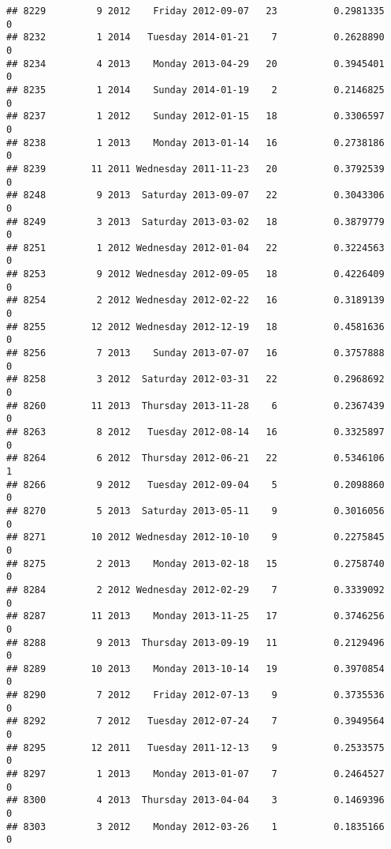 \documentclass[
]{article}
\begin{document}
\begin{verbatim}
## 8229         9 2012    Friday 2012-09-07   23          0.2981335             0
## 8232         1 2014   Tuesday 2014-01-21    7          0.2628890             0
## 8234         4 2013    Monday 2013-04-29   20          0.3945401             0
## 8235         1 2014    Sunday 2014-01-19    2          0.2146825             0
## 8237         1 2012    Sunday 2012-01-15   18          0.3306597             0
## 8238         1 2013    Monday 2013-01-14   16          0.2738186             0
## 8239        11 2011 Wednesday 2011-11-23   20          0.3792539             0
## 8248         9 2013  Saturday 2013-09-07   22          0.3043306             0
## 8249         3 2013  Saturday 2013-03-02   18          0.3879779             0
## 8251         1 2012 Wednesday 2012-01-04   22          0.3224563             0
## 8253         9 2012 Wednesday 2012-09-05   18          0.4226409             0
## 8254         2 2012 Wednesday 2012-02-22   16          0.3189139             0
## 8255        12 2012 Wednesday 2012-12-19   18          0.4581636             0
## 8256         7 2013    Sunday 2013-07-07   16          0.3757888             0
## 8258         3 2012  Saturday 2012-03-31   22          0.2968692             0
## 8260        11 2013  Thursday 2013-11-28    6          0.2367439             0
## 8263         8 2012   Tuesday 2012-08-14   16          0.3325897             0
## 8264         6 2012  Thursday 2012-06-21   22          0.5346106             1
## 8266         9 2012   Tuesday 2012-09-04    5          0.2098860             0
## 8270         5 2013  Saturday 2013-05-11    9          0.3016056             0
## 8271        10 2012 Wednesday 2012-10-10    9          0.2275845             0
## 8275         2 2013    Monday 2013-02-18   15          0.2758740             0
## 8284         2 2012 Wednesday 2012-02-29    7          0.3339092             0
## 8287        11 2013    Monday 2013-11-25   17          0.3746256             0
## 8288         9 2013  Thursday 2013-09-19   11          0.2129496             0
## 8289        10 2013    Monday 2013-10-14   19          0.3970854             0
## 8290         7 2012    Friday 2012-07-13    9          0.3735536             0
## 8292         7 2012   Tuesday 2012-07-24    7          0.3949564             0
## 8295        12 2011   Tuesday 2011-12-13    9          0.2533575             0
## 8297         1 2013    Monday 2013-01-07    7          0.2464527             0
## 8300         4 2013  Thursday 2013-04-04    3          0.1469396             0
## 8303         3 2012    Monday 2012-03-26    1          0.1835166             0

\end{verbatim}
\end{document}
